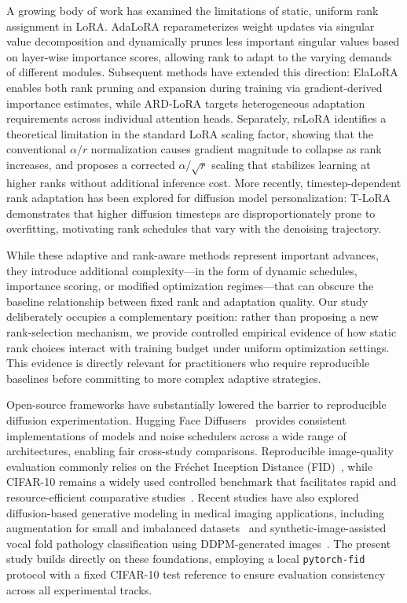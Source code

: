 \documentclass[pdflatex,sn-mathphys-num]{Springer_format/sn-jnl}
\begin{document}
  A growing body of work has examined the limitations of static, uniform rank assignment in
  LoRA. AdaLoRA \cite{zhang2023adalora} reparameterizes weight updates via singular value
  decomposition and dynamically prunes less important singular values based on layer-wise
  importance scores, allowing rank to adapt to the varying demands of different modules.
  Subsequent methods have extended this direction: ElaLoRA \cite{chang2025elalora} enables
  both rank pruning and expansion during training via gradient-derived importance estimates,
  while ARD-LoRA \cite{ardlora2025} targets heterogeneous adaptation requirements across
  individual attention heads. Separately, rsLoRA \cite{kalajdzievski2023rslora} identifies a
  theoretical limitation in the standard LoRA scaling factor, showing that the conventional
  $\alpha/r$ normalization causes gradient magnitude to collapse as rank increases, and
  proposes a corrected $\alpha/\sqrt{r}$ scaling that stabilizes learning at higher ranks
  without additional inference cost. More recently, timestep-dependent rank adaptation has
  been explored for diffusion model personalization: T-LoRA \cite{soboleva2025tlora}
  demonstrates that higher diffusion timesteps are disproportionately prone to overfitting,
  motivating rank schedules that vary with the denoising trajectory.
  
  While these adaptive and rank-aware methods represent important advances, they introduce
  additional complexity---in the form of dynamic schedules, importance scoring, or modified
  optimization regimes---that can obscure the baseline relationship between fixed rank and
  adaptation quality. Our study deliberately occupies a complementary position: rather than
  proposing a new rank-selection mechanism, we provide controlled empirical evidence of how
  static rank choices interact with training budget under uniform optimization settings. This
  evidence is directly relevant for practitioners who require reproducible baselines before
  committing to more complex adaptive strategies.
  
  Open-source frameworks have substantially lowered the barrier to reproducible diffusion experimentation. Hugging Face Diffusers~\cite{vonplaten2022diffusers} provides consistent implementations of models and noise schedulers across a wide range of architectures, enabling fair cross-study comparisons. Reproducible image-quality evaluation commonly relies on the Fr\'echet Inception Distance (FID)~\cite{heusel2017fid}, while CIFAR-10 remains a widely used controlled benchmark that facilitates rapid and resource-efficient comparative studies~\cite{krizhevsky2009learning}. Recent studies have also explored diffusion-based generative modeling in medical imaging applications, including augmentation for small and imbalanced datasets~\cite{khazrak2025addressing} and synthetic-image-assisted vocal fold pathology classification using DDPM-generated images~\cite{khazrak2025feasibility}. The present study builds directly on these foundations, employing a local \texttt{pytorch-fid} protocol with a fixed CIFAR-10 test reference to ensure evaluation consistency across all experimental tracks.
  
\end{document}

